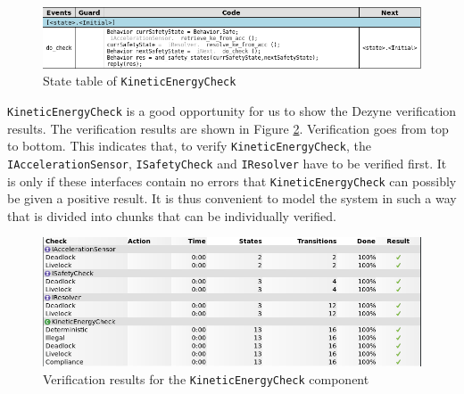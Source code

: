 \documentclass[12pt]{scrreprt}
\begin{document}
\begin{appendices}
\begin{figure}[H]
    \centering
    \includegraphics[width=\textwidth]{Figures/results/modelling_figures/KineticEnergyCheck/KineticEnergyCheck_state_table.png}
    \caption{State table of \texttt{KineticEnergyCheck}}
    \label{fig:KineticEnergyCheck_state_table}
\end{figure}

\texttt{KineticEnergyCheck} is a good opportunity for us to show the Dezyne verification results. The verification results are shown in Figure \ref{fig:kineticenergycheck_verification}. Verification goes from top to bottom. This indicates that, to verify \texttt{KineticEnergyCheck}, the \texttt{IAccelerationSensor}, \texttt{ISafetyCheck} and \texttt{IResolver} have to be verified first. It is only if these interfaces contain no errors that \texttt{KineticEnergyCheck} can possibly be given a positive result. It is thus convenient to model the system in such a way that is divided into chunks that can be individually verified.

\begin{figure}[H]
    \centering
    \includegraphics[width=\textwidth]{Figures/results/modelling_figures/KineticEnergyCheck/KineticEnergyCheck_verification.png}
    \caption{Verification results for the \texttt{KineticEnergyCheck} component}
    \label{fig:kineticenergycheck_verification}
\end{figure}


\end{appendices}
\end{document}
